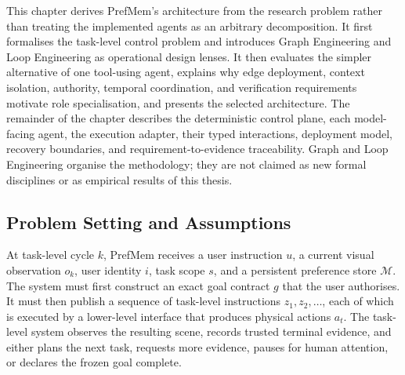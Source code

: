 \documentclass{article}
\begin{document}
This chapter derives PrefMem's architecture from the research problem rather
than treating the implemented agents as an arbitrary decomposition. It first
formalises the task-level control problem and introduces Graph Engineering and
Loop Engineering as operational design lenses. It then evaluates the simpler
alternative of one tool-using agent, explains why edge deployment, context
isolation, authority, temporal coordination, and verification requirements
motivate role specialisation, and presents the selected architecture. The
remainder of the chapter describes the deterministic control plane, each
model-facing agent, the execution adapter, their typed interactions, deployment
model, recovery boundaries, and requirement-to-evidence traceability. Graph
and Loop Engineering organise the methodology; they are not claimed as new
formal disciplines or as empirical results of this thesis.

\subsection{Problem Setting and Assumptions}
\label{subsec:methodology-problem-setting}

At task-level cycle \(k\), PrefMem receives a user instruction \(u\), a current
visual observation \(o_k\), user identity \(i\), task scope \(s\), and a
persistent preference store \(\mathcal{M}\). The system must first construct an
exact goal contract \(g\) that the user authorises. It must then publish a
sequence of task-level instructions \(z_1, z_2, \ldots\), each of which is
executed by a lower-level interface that produces physical actions \(a_t\). The
task-level system observes the resulting scene, records trusted terminal
evidence, and either plans the next task, requests more evidence, pauses for
human attention, or declares the frozen goal complete.
\end{document}
